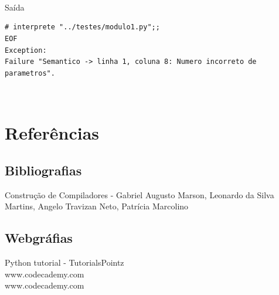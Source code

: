 \documentclass{article}
\begin{document}
\\\\\\Saída
\begin{lstlisting}
# interprete "../testes/modulo1.py";;
EOF
Exception:
Failure "Semantico -> linha 1, coluna 8: Numero incorreto de parametros".
\end{lstlisting}\\

\section{Referências}

\subsection{Bibliografias}
Construção de Compiladores - Gabriel Augusto Marson, Leonardo da Silva Martins, Angelo Travizan Neto, Patrícia Marcolino

\subsection{Webgráfias}
Python tutorial - TutorialsPointz\\
www.codecademy.com\\
www.codecademy.com
\end{document}

